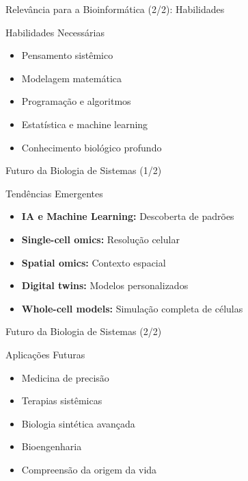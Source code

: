 \begin{frame}{Relevância para a Bioinformática (2/2): Habilidades}
\begin{exampleblock}{Habilidades Necessárias}
\begin{itemize}
    \item Pensamento sistêmico
    \item Modelagem matemática
    \item Programação e algoritmos
    \item Estatística e machine learning
    \item Conhecimento biológico profundo
\end{itemize}
\end{exampleblock}
\end{frame}

\begin{frame}{Futuro da Biologia de Sistemas (1/2)}
\begin{block}{Tendências Emergentes}
\begin{itemize}
    \item \textbf{IA e Machine Learning:} Descoberta de padrões
    \item \textbf{Single-cell omics:} Resolução celular
    \item \textbf{Spatial omics:} Contexto espacial
    \item \textbf{Digital twins:} Modelos personalizados
    \item \textbf{Whole-cell models:} Simulação completa de células
\end{itemize}
\end{block}
\end{frame}

\begin{frame}{Futuro da Biologia de Sistemas (2/2)}
\begin{exampleblock}{Aplicações Futuras}
\begin{itemize}
    \item Medicina de precisão
    \item Terapias sistêmicas
    \item Biologia sintética avançada
    \item Bioengenharia
    \item Compreensão da origem da vida
\end{itemize}
\end{exampleblock}
\end{frame}

